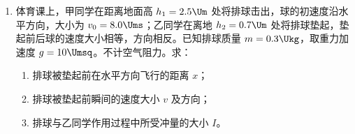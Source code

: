 \documentclass[\gkver]{gaokaozhenti}
\begin{document}
\begin{enumerate}
{$g = \frac{v}{t}$

根据 $v-t$ 图像可知其斜率为重力加速度，则有

$g = \frac{2.7 - 0.35}{0.24}\Umsq = 9.79\Umsq$

（4）需要测量的物理量：水滴下落的高度 $h$ 和下落的时间 $t$。

测量 $h$ 的方法：用刻度尺测量水龙头出水口到地面的高度，多次测量取平均值；

测量 $t$ 的方法：调节水龙头阀门，使一滴水开始下落的同时，恰好听到前一滴水落地时发出的清脆声音。用手机测量 $n$ 滴水下落的总时间 $t_{n}$，则 $t = \frac{t_{n}}{n}$
}

\item
体育课上，甲同学在距离地面高 $h_{1} = 2.5\Um$ 处将排球击出，球的初速度沿水平方向，大小为 $v_{0} = 8.0\Ums$；乙同学在离地 $h_{2} = 0.7\Um$ 处将排球垫起，垫起前后球的速度大小相等，方向相反。已知排球质量 $m = 0.3\Ukg$，取重力加速度 $g = 10\Umsq$。不计空气阻力。求：
\begin{enumerate}
	\item
	排球被垫起前在水平方向飞行的距离 $x$；
	\item
	排球被垫起前瞬间的速度大小 $v$ 及方向；
	\item
	排球与乙同学作用过程中所受冲量的大小 $I$。
\end{enumerate}


\end{enumerate}
\end{document}
